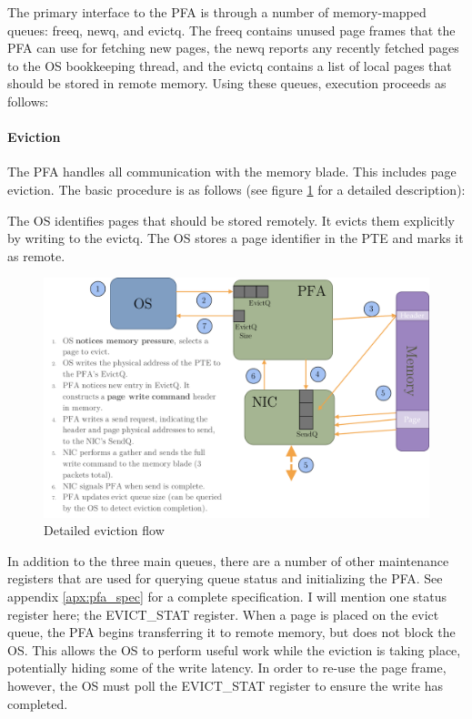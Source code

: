 The primary interface to the PFA is through a number of memory-mapped queues:
\gls{freeq}, \gls{newq}, and \gls{evictq}. The \gls{freeq} contains unused page frames that the PFA can
use for fetching new pages, the \gls{newq} reports any recently fetched pages to the
OS bookkeeping thread, and the \gls{evictq} contains a list of local pages that
should be stored in remote memory. Using these queues, execution proceeds as
follows:

\paragraph{Eviction}
The PFA handles all communication with the memory blade. This includes page
eviction. The basic procedure is as follows (see figure \ref{fig:evict_detail}
for a detailed description):

\begin{outline}[enumerate]
    \1 The OS identifies pages that should be stored remotely.
    \1 It evicts them explicitly by writing to the \gls{evictq}.
    \1 The OS stores a page identifier in the PTE and marks it as remote.
\end{outline}

\begin{figure}[h] \centering
  \includegraphics[width=\columnwidth]{figs/pfa_evict_detail.pdf}
  \vspace{-5mm}
  \caption{Detailed eviction flow}
  \label{fig:evict_detail}
\end{figure}

In addition to the three main queues, there are a number of other maintenance
registers that are used for querying queue status and initializing the PFA. See
appendix \ref{apx:pfa_spec} for a complete specification. I will mention one status
register here; the EVICT\_STAT register. When a page is placed on the evict
queue, the PFA begins transferring it to remote memory, but does not block
the OS. This allows the OS to perform useful work while the eviction is taking
place, potentially hiding some of the write latency. In order to re-use the
page frame, however, the OS must poll the EVICT\_STAT register to ensure the
write has completed.

